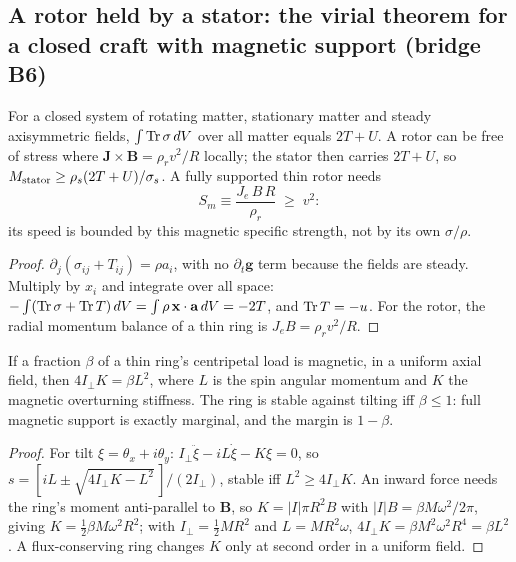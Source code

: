 \subsection{A rotor held by a stator: the virial theorem for a closed craft with magnetic support (bridge B6)}
\begin{theorem}\label{thm:stator}
For a closed system of rotating matter, stationary matter and steady axisymmetric fields, $\int\operatorname{Tr}\sigma\,dV$ over all matter equals $2T+U$.
A rotor can be free of stress where $\mathbf J\times\mathbf B=\rho_rv^2/R$ locally; the stator then carries $2T+U$, so
$M_{\rm stator}\ge\rho_s(2T+U)/\sigma_s$. A fully supported thin rotor needs
\begin{equation}
S_m\equiv\frac{J_e\,B\,R}{\rho_r}\;\ge\;v^2 :\label{eq:sm}
\end{equation}
its speed is bounded by this magnetic specific strength, not by its own $\sigma/\rho$.
\end{theorem}
\begin{proof}
$\partial_j(\sigma_{ij}+T_{ij})=\rho a_i$, with no $\partial_t\mathbf g$ term because the fields are steady. Multiply by $x_i$ and integrate over
all space: $-\int(\operatorname{Tr}\sigma+\operatorname{Tr} T)\,dV=\int\rho\,\mathbf x\cdot\mathbf a\,dV=-2T$, and $\operatorname{Tr} T=-u$. For the rotor, the radial momentum balance
of a thin ring is $J_eB=\rho_rv^2/R$.
\end{proof}
\begin{corollary}[tilt]\label{cor:tilt}
If a fraction $\beta$ of a thin ring's centripetal load is magnetic, in a uniform axial field, then $4I_\perp K=\beta L^2$, where $L$ is the
spin angular momentum and $K$ the magnetic overturning stiffness. The ring is stable against tilting iff $\beta\le1$: full magnetic support
is exactly marginal, and the margin is $1-\beta$.
\end{corollary}
\begin{proof}
For tilt $\xi=\theta_x+i\theta_y$: $I_\perp\ddot\xi-iL\dot\xi-K\xi=0$, so $s=[iL\pm\sqrt{4I_\perp K-L^2}\,]/(2I_\perp)$, stable iff
$L^2\ge4I_\perp K$. An inward force needs the ring's moment anti-parallel to $\mathbf B$, so $K=|I|\pi R^2B$ with $|I|B=\beta M\omega^2/2\pi$, giving
$K=\tfrac12\beta M\omega^2R^2$; with $I_\perp=\tfrac12MR^2$ and $L=MR^2\omega$, $4I_\perp K=\beta M^2\omega^2R^4=\beta L^2$. A
flux-conserving ring changes $K$ only at second order in a uniform field.
\end{proof}
